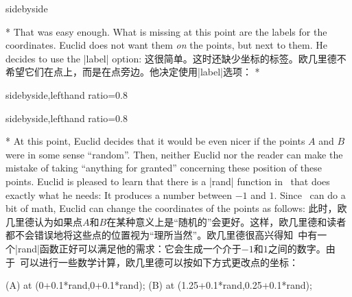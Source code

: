 \begin{paracol}{2}
\begin{dispExample*}{sidebyside}
\end{dispExample*}

\switchcolumn[0]*%
That was easy enough. What is missing at this point are the labels for the
coordinates. Euclid does not want them \emph{on} the points, but next to them.
He decides to use the |label| option:
\switchcolumn
这很简单。这时还缺少坐标的标签。欧几里德不希望它们在点上，而是在点旁边。他决定使用|label|选项：
%
\switchcolumn[0]*%
\begin{dispExample*}{sidebyside,lefthand ratio=0.8}

\end{dispExample*}
\switchcolumn
\begin{dispExample*}{sidebyside,lefthand ratio=0.8}

\end{dispExample*}

\switchcolumn[0]*%
At this point, Euclid decides that it would be even nicer if the points $A$ and
$B$ were in some sense ``random''. Then, neither Euclid nor the reader can make
the mistake of taking ``anything for granted'' concerning these position of
these points. Euclid is pleased to learn that there is a |rand| function in
\tikzname\ that does exactly what he needs: It produces a number between $-1$
and $1$. Since \tikzname\ can do a bit of math, Euclid can change the
coordinates of the points as follows:
\switchcolumn
此时，欧几里德认为如果点$A$和$B$在某种意义上是“随机的”会更好。这样，欧几里德和读者都不会错误地将这些点的位置视为“理所当然”。欧几里德很高兴得知\tikzname\ 中有一个|rand|函数正好可以满足他的需求：它会生成一个介于$-1$和$1$之间的数字。由于\tikzname\ 可以进行一些数学计算，欧几里德可以按如下方式更改点的坐标：
\switchcolumn[1]\begin{codeexample}
\coordinate [...] (A) at (0+0.1*rand,0+0.1*rand);
\coordinate [...] (B) at (1.25+0.1*rand,0.25+0.1*rand);
\end{codeexample}


\end{paracol}
